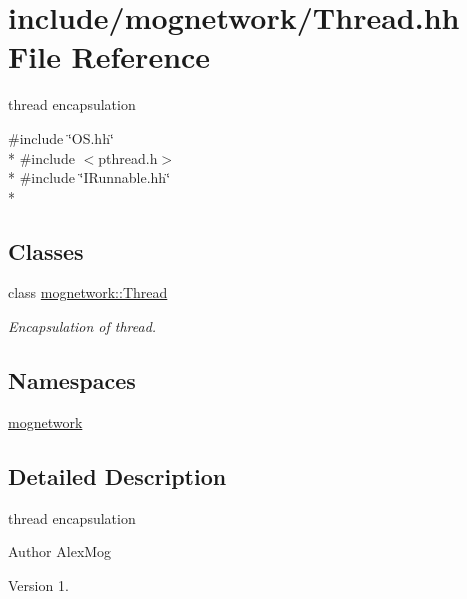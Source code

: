 \hypertarget{_thread_8hh}{\section{include/mognetwork/\-Thread.hh File Reference}
\label{_thread_8hh}
}


thread encapsulation  


{\ttfamily \#include \char`\"{}O\-S.\-hh\char`\"{}}\\*
{\ttfamily \#include $<$pthread.\-h$>$}\\*
{\ttfamily \#include \char`\"{}I\-Runnable.\-hh\char`\"{}}\\*
\subsection*{Classes}
\begin{DoxyCompactItemize}
\item 
class \hyperlink{classmognetwork_1_1_thread}{mognetwork\-::\-Thread}
\begin{DoxyCompactList}\small\item\em Encapsulation of thread. \end{DoxyCompactList}\end{DoxyCompactItemize}
\subsection*{Namespaces}
\begin{DoxyCompactItemize}
\item 
\hyperlink{namespacemognetwork}{mognetwork}
\end{DoxyCompactItemize}


\subsection{Detailed Description}
thread encapsulation \begin{DoxyAuthor}{Author}
Alex\-Mog 
\end{DoxyAuthor}
\begin{DoxyVersion}{Version}
1. 
\end{DoxyVersion}
